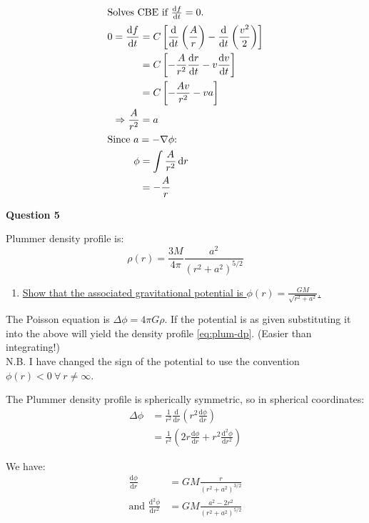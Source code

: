 \documentclass{article}
\begin{document}
\begin{align}
  \intertext{Solves CBE if $\frac{\mathrm{d}f}{\mathrm{d}t}=0$.}
  0=\frac{\mathrm{d}f}{\mathrm{d}t}&=C\left[\frac{\mathrm{d}}{\mathrm{d}t}\left(\frac{A}{r}\right)-\frac{\mathrm{d}}{\mathrm{d}t}\left(\frac{v^2}{2}\right)\right]\\
                                 &=C\left[-\frac{A}{r^2}\frac{\mathrm{d}r}{\mathrm{d}t}-v\frac{\mathrm{d}v}{\mathrm{d}t}\right]\\
                                 &=C\left[-\frac{Av}{r^2} - va\right]\\
  \Rightarrow \frac{A}{r^2}&=a\\
  \shortintertext{Since $a=-\nabla\phi$:}
  \phi&=\int\frac{A}{r^2}\,\mathrm{d}r\\
  &=-\frac{A}{r}
\end{align}

{\Large{\bfseries Question 5}\normalsize}

Plummer density profile is:
\begin{equation}
  \rho(r)=\frac{3M}{4\pi}\frac{a^2}{(r^2+a^2)^{5/2}}
  \label{eq:plum-dp}
\end{equation}

\begin{enumerate}[label=(\alph*)]
\item\underline{Show that the associated gravitational potential is $\phi(r)=\frac{GM}{\sqrt{r^2+a^2}}$.}
\end{enumerate}

The Poisson equation is $\Delta\phi=4\pi G\rho$. If the potential is as given substituting it into the above will yield the density profile \eqref{eq:plum-dp}. (Easier than integrating!)\\
N.B. I have changed the sign of the potential to use the convention $\phi(r)<0\ \forall\ r\neq\infty$.  

The Plummer density profile is spherically symmetric, so in spherical coordinates:
\begin{align}
  \Delta\phi&=\frac{1}{r^2}\frac{\mathrm{d}}{\mathrm{d}r}\left(r^2 \frac{\mathrm{d}\phi}{\mathrm{d}r}\right)\\
  &=\frac{1}{r^2}\left(2r\frac{\mathrm{d}\phi}{\mathrm{d}r}+r^2\frac{\mathrm{d}^2\phi}{\mathrm{d}r^2}\right)
\end{align}

We have:
\begin{align}
  \frac{\mathrm{d}\phi}{\mathrm{d}r}&=GM\frac{r}{\left(r^2+a^2\right)^{3/2}}\\
  \mbox{and }\frac{\mathrm{d}^2\phi}{\mathrm{d}r^2}&=GM\frac{a^2-2r^2}{\left(r^2+a^2\right)^{5/2}}
\end{align}
\end{document}
